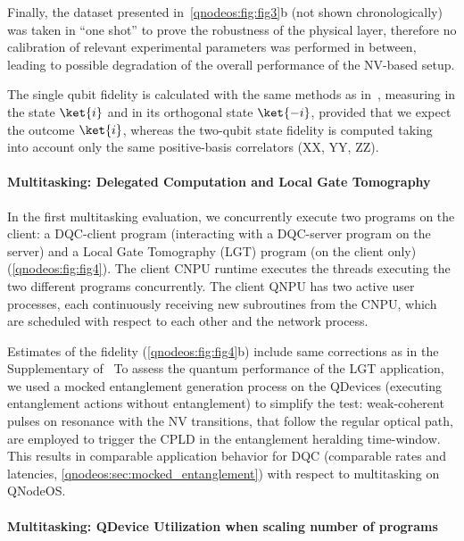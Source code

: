 Finally, the dataset presented in~\cref{qnodeos:fig:fig3}b (not shown chronologically) was taken in “one shot” to prove the robustness of the physical layer, therefore no calibration of relevant experimental parameters was performed in between, leading to possible degradation of the overall performance of the NV-based setup.

The single qubit fidelity is calculated with the same methods as in~\cite{iuliano2024qubit}, measuring in the state $\ket{i}$ and in its orthogonal state $\ket{-i}$, provided that we expect the outcome $\ket{i}$, whereas the two-qubit state fidelity is computed taking into account only the same positive-basis correlators (XX, YY, ZZ).

\paragraph{Multitasking: Delegated Computation and Local Gate Tomography}

In the first multitasking evaluation, we concurrently execute two programs on the client: a DQC-client program (interacting with a DQC-server program on the server) and a Local Gate Tomography (LGT) program (on the client only) (\cref{qnodeos:fig:fig4}).
The client CNPU runtime executes the threads executing the two different programs concurrently.
The client QNPU has two active user processes, each continuously receiving new subroutines from the CNPU, which are scheduled with respect to each other and the network process.

Estimates of the fidelity (\cref{qnodeos:fig:fig4}b) include same corrections as in the Supplementary of~\cite{pompili_2021_multinode} To assess the quantum performance of the LGT application, we used a mocked entanglement generation process on the QDevices (executing entanglement actions without entanglement) to simplify the test: weak-coherent pulses on resonance with the NV transitions, that follow the regular optical path, are employed to trigger the CPLD in the entanglement heralding time-window.
This results in comparable application behavior for DQC (comparable rates and latencies, \cref{qnodeos:sec:mocked_entanglement}) with respect to multitasking on QNodeOS.

\paragraph{Multitasking: QDevice Utilization when scaling number of programs}

